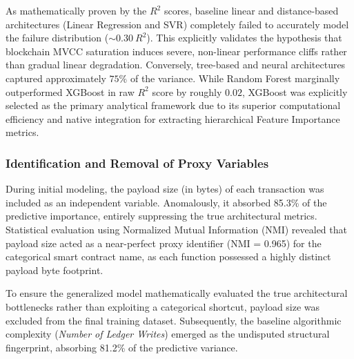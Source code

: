\documentclass[12pt]{article}
\begin{document}
	\begin{table}[ht]
\centering
\caption{Comparative Predictive Performance (Target: Transaction Failure Rate)}
\label{tab:ml_performance}
\end{table}

As mathematically proven by the $R^2$ scores, baseline linear and distance-based architectures (Linear Regression and SVR) completely failed to accurately model the failure distribution ($\sim0.30~R^2$). This explicitly validates the hypothesis that blockchain MVCC saturation induces severe, non-linear performance cliffs rather than gradual linear degradation. Conversely, tree-based and neural architectures captured approximately $75\%$ of the variance. While Random Forest marginally outperformed XGBoost in raw $R^2$ score by roughly $0.02$, XGBoost was explicitly selected as the primary analytical framework due to its superior computational efficiency and native integration for extracting hierarchical Feature Importance metrics.

	\subsubsection{Identification and Removal of Proxy Variables}
	During initial modeling, the payload size (in bytes) of each transaction was included as an independent variable. Anomalously, it absorbed 85.3\% of the predictive importance, entirely suppressing the true architectural metrics. Statistical evaluation using Normalized Mutual Information (NMI) revealed that payload size acted as a near-perfect proxy identifier (NMI = 0.965) for the categorical smart contract name, as each function possessed a highly distinct payload byte footprint. 
	
	To ensure the generalized model mathematically evaluated the true architectural bottlenecks rather than exploiting a categorical shortcut, payload size was excluded from the final training dataset. Subsequently, the baseline algorithmic complexity (\textit{Number of Ledger Writes}) emerged as the undisputed structural fingerprint, absorbing 81.2\% of the predictive variance.
\end{document}
